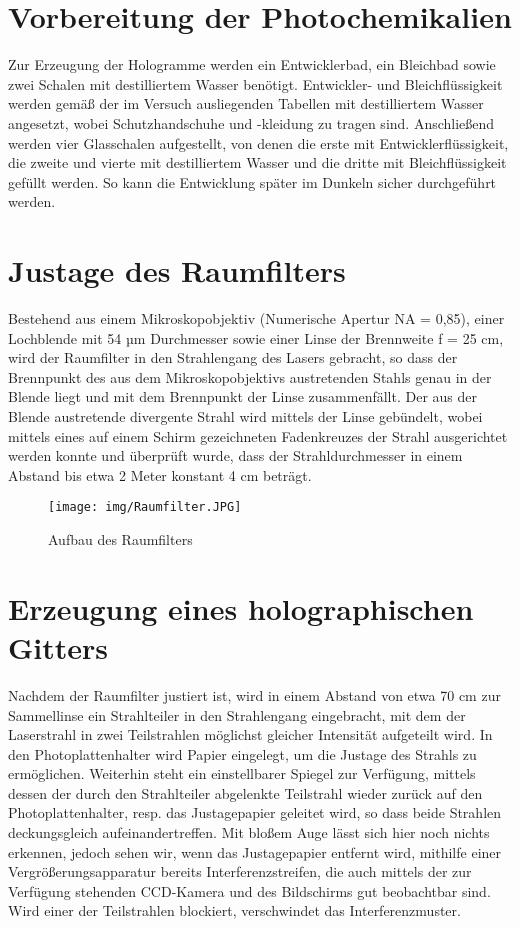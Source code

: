 \documentclass[bigchapter,colorback,accentcolor=tud4b,linedtoc,11pt]{tudreport}
\begin{document}
\section{Vorbereitung der Photochemikalien}

Zur Erzeugung der Hologramme werden ein Entwicklerbad, ein Bleichbad sowie zwei Schalen mit destilliertem Wasser benötigt. Entwickler- und Bleichflüssigkeit werden gemäß der im Versuch ausliegenden Tabellen mit destilliertem Wasser angesetzt, wobei Schutzhandschuhe und -kleidung zu tragen sind. Anschließend werden vier Glasschalen aufgestellt, von denen die erste mit Entwicklerflüssigkeit, die zweite und vierte mit destilliertem Wasser und die dritte mit Bleichflüssigkeit gefüllt werden. So kann die Entwicklung später im Dunkeln sicher durchgeführt werden.

\section{Justage des Raumfilters}

Bestehend aus einem Mikroskopobjektiv (Numerische Apertur NA = 0,85), einer Lochblende mit 54 µm Durchmesser sowie einer Linse der Brennweite f = 25 cm, wird der Raumfilter in den Strahlengang des Lasers gebracht, so dass der Brennpunkt des aus dem Mikroskopobjektivs austretenden Stahls genau in der Blende liegt und mit dem Brennpunkt der Linse zusammenfällt. Der aus der Blende austretende divergente Strahl wird mittels der Linse gebündelt, wobei mittels eines auf einem Schirm gezeichneten Fadenkreuzes der Strahl ausgerichtet werden konnte und überprüft wurde, dass der Strahldurchmesser in einem Abstand bis etwa 2 Meter konstant 4 cm beträgt.

\begin{figure}[H]
\centering
\texttt{[image: img/Raumfilter.JPG]}
\caption{Aufbau des Raumfilters}
\end{figure}

\section{Erzeugung eines holographischen Gitters}

Nachdem der Raumfilter justiert ist, wird in einem Abstand von etwa 70 cm zur Sammellinse ein Strahlteiler in den Strahlengang eingebracht, mit dem der Laserstrahl in zwei Teilstrahlen möglichst gleicher Intensität aufgeteilt wird. In den Photoplattenhalter wird Papier eingelegt, um die Justage des Strahls zu ermöglichen. Weiterhin steht ein einstellbarer Spiegel zur Verfügung, mittels dessen der durch den Strahlteiler abgelenkte Teilstrahl wieder zurück auf den Photoplattenhalter, resp. das Justagepapier geleitet wird, so dass beide Strahlen deckungsgleich aufeinandertreffen. Mit bloßem Auge lässt sich hier noch nichts erkennen, jedoch sehen wir, wenn das Justagepapier entfernt wird, mithilfe einer Vergrößerungsapparatur bereits Interferenzstreifen, die auch mittels der zur Verfügung stehenden CCD-Kamera und des Bildschirms gut beobachtbar sind. Wird einer der Teilstrahlen blockiert, verschwindet das Interferenzmuster.
\end{document}
